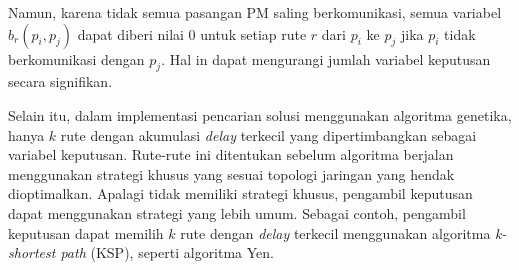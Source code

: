 Namun, karena tidak semua pasangan PM saling berkomunikasi, semua variabel $b_r(p_i,p_j)$ dapat diberi nilai 0 untuk setiap rute $r$ dari $p_i$ ke $p_j$ jika $p_i$ tidak berkomunikasi dengan $p_j$. Hal in dapat mengurangi jumlah variabel keputusan secara signifikan. 

Selain itu, dalam implementasi pencarian solusi menggunakan algoritma genetika, hanya $k$ rute dengan akumulasi \textit{delay} terkecil yang dipertimbangkan sebagai variabel keputusan. Rute-rute ini  ditentukan sebelum algoritma berjalan menggunakan strategi khusus yang sesuai topologi jaringan yang hendak dioptimalkan. Apalagi tidak memiliki strategi khusus, pengambil keputusan dapat menggunakan strategi yang lebih umum. Sebagai contoh, pengambil keputusan dapat memilih $k$ rute dengan \textit{delay} terkecil menggunakan algoritma \textit{k-shortest path} (KSP), seperti algoritma Yen. 
